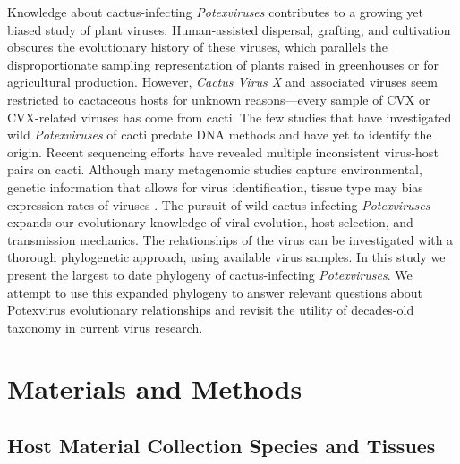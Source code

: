 \documentclass[fleqn,10pt,lineno]{wlpeerj}
\begin{document}
Knowledge about cactus-infecting \textit{Potexviruses} contributes to a growing yet biased study of plant viruses. 
Human-assisted dispersal, grafting, and cultivation obscures the evolutionary history of these viruses, which parallels the disproportionate sampling representation of plants raised in greenhouses or for agricultural production. 
However, \textit{Cactus Virus X} and associated viruses seem restricted to cactaceous hosts for unknown reasons---every sample of CVX or CVX-related viruses has come from cacti.
The few studies that have investigated wild \textit{Potexviruses} of cacti predate DNA methods and have yet to identify the origin.
Recent sequencing efforts have revealed multiple inconsistent virus-host pairs on cacti.
Although many metagenomic studies capture environmental, genetic information that allows for virus identification, tissue type may bias expression rates of viruses \citep{lacroix2016methodological}.
The pursuit of wild cactus-infecting \textit{Potexviruses} expands our evolutionary knowledge of viral evolution, host selection, and transmission mechanics. 
The relationships of the virus can be investigated with a thorough phylogenetic approach, using available virus samples. 
In this study we present the largest to date phylogeny of cactus-infecting \textit{Potexviruses}.
We attempt to use this expanded phylogeny to answer relevant questions about Potexvirus evolutionary relationships and revisit the utility of decades-old taxonomy in current virus research. 


\section*{Materials and Methods}

\subsection*{Host Material Collection Species and Tissues}
\end{document}
